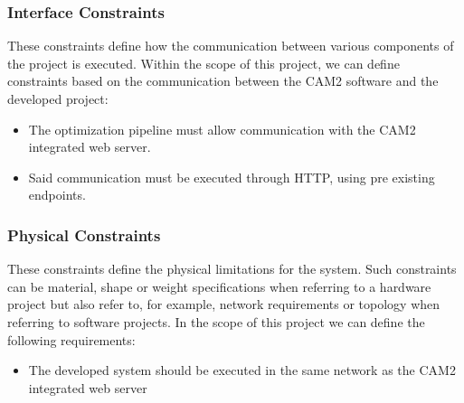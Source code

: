
\subsubsection{Interface Constraints} 

These constraints define how the communication between various components of the project is executed. Within the scope of this project, we can define constraints based on the communication between the CAM2\textsuperscript{\textregistered} software and the developed project:

\begin{itemize}
	\item The optimization pipeline must allow communication with the CAM2\textsuperscript{\textregistered} integrated web server.
	\item Said communication must be executed through HTTP, using pre existing endpoints.
\end{itemize}

\subsubsection{Physical Constraints}

These constraints define the physical limitations for the system. Such constraints can be material, shape or weight specifications when referring to a hardware project but also refer to, for example, network requirements or topology when referring to software projects. In the scope of this project we can define the following requirements:

\begin{itemize}
	\item The developed system should be executed in the same network as the CAM2\textsuperscript{\textregistered} integrated web server 
\end{itemize}
